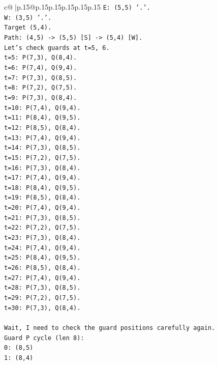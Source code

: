 \documentclass{article}
\begin{document}
{\begin{supertabular}{c@{$\;$}|p{.15\linewidth}@{}p{.15\linewidth}p{.15\linewidth}p{.15\linewidth}p{.15\linewidth}p{.15\linewidth}}
{{{\texttt{E: (5,5) '.'.} \\
\texttt{W: (3,5) '.'.} \\
\texttt{Target (5,4).} \\
\texttt{Path: (4,5) {-}> (5,5) {[}S{]} {-}> (5,4) {[}W{]}.} \\
\texttt{Let's check guards at t=5, 6.} \\
\texttt{t=5: P(7,3), Q(8,4).} \\
\texttt{t=6: P(7,4), Q(9,4).} \\
\texttt{t=7: P(7,3), Q(8,5).} \\
\texttt{t=8: P(7,2), Q(7,5).} \\
\texttt{t=9: P(7,3), Q(8,4).} \\
\texttt{t=10: P(7,4), Q(9,4).} \\
\texttt{t=11: P(8,4), Q(9,5).} \\
\texttt{t=12: P(8,5), Q(8,4).} \\
\texttt{t=13: P(7,4), Q(9,4).} \\
\texttt{t=14: P(7,3), Q(8,5).} \\
\texttt{t=15: P(7,2), Q(7,5).} \\
\texttt{t=16: P(7,3), Q(8,4).} \\
\texttt{t=17: P(7,4), Q(9,4).} \\
\texttt{t=18: P(8,4), Q(9,5).} \\
\texttt{t=19: P(8,5), Q(8,4).} \\
\texttt{t=20: P(7,4), Q(9,4).} \\
\texttt{t=21: P(7,3), Q(8,5).} \\
\texttt{t=22: P(7,2), Q(7,5).} \\
\texttt{t=23: P(7,3), Q(8,4).} \\
\texttt{t=24: P(7,4), Q(9,4).} \\
\texttt{t=25: P(8,4), Q(9,5).} \\
\texttt{t=26: P(8,5), Q(8,4).} \\
\texttt{t=27: P(7,4), Q(9,4).} \\
\texttt{t=28: P(7,3), Q(8,5).} \\
\texttt{t=29: P(7,2), Q(7,5).} \\
\texttt{t=30: P(7,3), Q(8,4).} \\
\\ 
\texttt{Wait, I need to check the guard positions carefully again.} \\
\texttt{Guard P cycle (len 8):} \\
\texttt{0: (8,5)} \\
\texttt{1: (8,4)} \\
}}}
\end{supertabular}}
\end{document}
